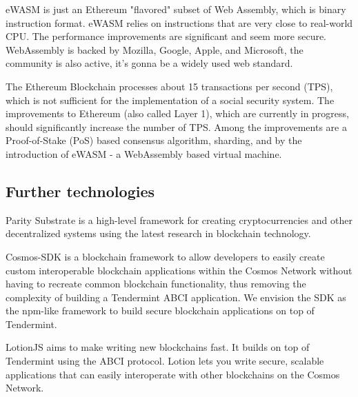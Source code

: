 eWASM is just an Ethereum "flavored" subset of Web Assembly, which is binary instruction format. eWASM  relies on instructions that are very close to real-world CPU. The performance improvements are significant and seem more secure. WebAssembly is backed by Mozilla, Google, Apple, and Microsoft, the community is also active, it's gonna be a widely used web standard.  

The Ethereum Blockchain processes about 15 transactions per second (TPS), which is not sufficient for the implementation of a social security system. The improvements to Ethereum (also called Layer 1), which are currently in progress, should significantly increase the number of TPS. Among the improvements are a Proof-of-Stake (PoS) based consensus algorithm, sharding, and by the introduction of eWASM - a WebAssembly based virtual machine.

\subsection{Further technologies}
Parity Substrate is a high-level framework for creating cryptocurrencies and other decentralized systems using the latest research in blockchain technology. 

Cosmos-SDK is a blockchain framework to allow developers to easily create custom interoperable blockchain applications within the Cosmos Network without having to recreate common blockchain functionality, thus removing the complexity of building a Tendermint ABCI application. We envision the SDK as the npm-like framework to build secure blockchain applications on top of Tendermint.

LotionJS aims to make writing new blockchains fast. It builds on top of Tendermint using the ABCI protocol. Lotion lets you write secure, scalable applications that can easily interoperate with other blockchains on the Cosmos Network.

